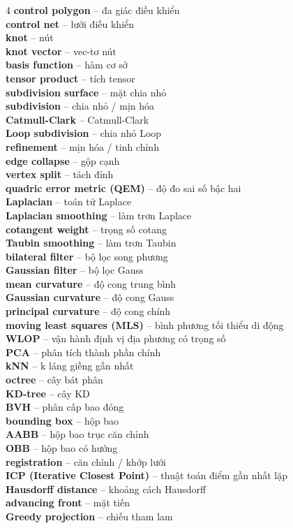 \begin{multicols}{4}
\textbf{control polygon} -- đa giác điều khiển\\
\textbf{control net} -- lưới điều khiển\\
\textbf{knot} -- nút\\
\textbf{knot vector} -- vec-tơ nút\\
\textbf{basis function} -- hàm cơ sở\\
\textbf{tensor product} -- tích tensor\\
\textbf{subdivision surface} -- mặt chia nhỏ\\
\textbf{subdivision} -- chia nhỏ / mịn hóa\\
\textbf{Catmull-Clark} -- Catmull-Clark\\
\textbf{Loop subdivision} -- chia nhỏ Loop\\
\textbf{refinement} -- mịn hóa / tinh chỉnh\\
\textbf{edge collapse} -- gộp cạnh\\
\textbf{vertex split} -- tách đỉnh\\
\textbf{quadric error metric (QEM)} -- độ đo sai số bậc hai\\
\textbf{Laplacian} -- toán tử Laplace\\
\textbf{Laplacian smoothing} -- làm trơn Laplace\\
\textbf{cotangent weight} -- trọng số cotang\\
\textbf{Taubin smoothing} -- làm trơn Taubin\\
\textbf{bilateral filter} -- bộ lọc song phương\\
\textbf{Gaussian filter} -- bộ lọc Gauss\\
\textbf{mean curvature} -- độ cong trung bình\\
\textbf{Gaussian curvature} -- độ cong Gauss\\
\textbf{principal curvature} -- độ cong chính\\
\textbf{moving least squares (MLS)} -- bình phương tối thiểu di động\\
\textbf{WLOP} -- vận hành định vị địa phương có trọng số\\
\textbf{PCA} -- phân tích thành phần chính\\
\textbf{kNN} -- k láng giềng gần nhất\\
\textbf{octree} -- cây bát phân\\
\textbf{KD-tree} -- cây KD\\
\textbf{BVH} -- phân cấp bao đóng\\
\textbf{bounding box} -- hộp bao\\
\textbf{AABB} -- hộp bao trục căn chỉnh\\
\textbf{OBB} -- hộp bao có hướng\\
\textbf{registration} -- căn chỉnh / khớp lưới\\
\textbf{ICP (Iterative Closest Point)} -- thuật toán điểm gần nhất lặp\\
\textbf{Hausdorff distance} -- khoảng cách Hausdorff\\
\textbf{advancing front} -- mặt tiến\\
\textbf{Greedy projection} -- chiếu tham lam\\


\end{multicols}
